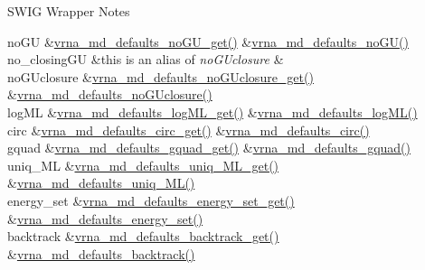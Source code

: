\begin{DoxyRefDesc}{S\+W\+I\+G Wrapper Notes}
\begin{longtabu}
no\+GU  &\mbox{\hyperlink{group__model__details_ga5faa7d4e536d7fe36ec25428c0cf2563}{vrna\+\_\+md\+\_\+defaults\+\_\+no\+G\+U\+\_\+get()}}  &\mbox{\hyperlink{group__model__details_ga98218f85c7a957a1d1ddf4627fdf5a39}{vrna\+\_\+md\+\_\+defaults\+\_\+no\+G\+U()}}   \\
no\+\_\+closing\+GU  &this is an alias of {\itshape no\+G\+Uclosure}  &\\
no\+G\+Uclosure  &\mbox{\hyperlink{group__model__details_ga4f7fdad083243a5348d63320ddaa70f3}{vrna\+\_\+md\+\_\+defaults\+\_\+no\+G\+Uclosure\+\_\+get()}}  &\mbox{\hyperlink{group__model__details_gade5b9951d71ca2fb357a4e6c0c18ccd1}{vrna\+\_\+md\+\_\+defaults\+\_\+no\+G\+Uclosure()}}   \\
log\+ML  &\mbox{\hyperlink{group__model__details_ga93f04e070d529c5d0bb87c9681f6ad29}{vrna\+\_\+md\+\_\+defaults\+\_\+log\+M\+L\+\_\+get()}}  &\mbox{\hyperlink{group__model__details_ga3de50a73455d88c3957386933b8e1f90}{vrna\+\_\+md\+\_\+defaults\+\_\+log\+M\+L()}}   \\
circ  &\mbox{\hyperlink{group__model__details_gad3a7e58de344ad93a08925f58f94f6fb}{vrna\+\_\+md\+\_\+defaults\+\_\+circ\+\_\+get()}}  &\mbox{\hyperlink{group__model__details_ga4e1deb3e91a8a99e5c6dd905a5eb0186}{vrna\+\_\+md\+\_\+defaults\+\_\+circ()}}   \\
gquad  &\mbox{\hyperlink{group__model__details_gae645b8612f879eb38b45244fa9eddb9e}{vrna\+\_\+md\+\_\+defaults\+\_\+gquad\+\_\+get()}}  &\mbox{\hyperlink{group__model__details_ga0685ca2aeb39af76f2421fc308163dce}{vrna\+\_\+md\+\_\+defaults\+\_\+gquad()}}   \\
uniq\+\_\+\+ML  &\mbox{\hyperlink{group__model__details_gab48e70fd024bf838404bcbcca0c874a0}{vrna\+\_\+md\+\_\+defaults\+\_\+uniq\+\_\+\+M\+L\+\_\+get()}}  &\mbox{\hyperlink{group__model__details_ga59b944f61c5d2babec2d4c48c820de67}{vrna\+\_\+md\+\_\+defaults\+\_\+uniq\+\_\+\+M\+L()}}   \\
energy\+\_\+set  &\mbox{\hyperlink{group__model__details_ga017ed6afb1cba2b7f242412cab618b53}{vrna\+\_\+md\+\_\+defaults\+\_\+energy\+\_\+set\+\_\+get()}}  &\mbox{\hyperlink{group__model__details_ga8dd29c55787a4576277e1907e92d810c}{vrna\+\_\+md\+\_\+defaults\+\_\+energy\+\_\+set()}}   \\
backtrack  &\mbox{\hyperlink{group__model__details_ga90da1156e6883ddd68527c2830706648}{vrna\+\_\+md\+\_\+defaults\+\_\+backtrack\+\_\+get()}}  &\mbox{\hyperlink{group__model__details_ga978c468b2fe96a70d5191e3dd17d5599}{vrna\+\_\+md\+\_\+defaults\+\_\+backtrack()}}   \\

\end{longtabu}
\end{DoxyRefDesc}
